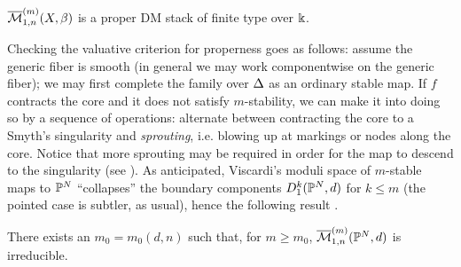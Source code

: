 \begin{prop}\cite[Theorem 3.6]{VISC}
 $\overline{\mathcal{M}}^{(m)}_{1,n}(X,\beta)$ is a proper DM stack of finite type over $\Bbbk$.
\end{prop}
Checking the valuative criterion for properness goes as follows: assume the generic fiber is smooth (in general we may work componentwise on the generic fiber); we may first complete the family over $\Delta$ as an ordinary stable map. If $f$ contracts the core and it does not satisfy $m$-stability, we can make it into doing so by a sequence of operations: alternate between contracting the core to a Smyth's singularity and \emph{sprouting}, i.e. blowing up at markings or nodes along the core. Notice that more sprouting may be required in order for the map to descend to the singularity (see \cite[Remark 2.6]{BCM}). As anticipated, Viscardi's moduli space of $m$-stable maps to $\mathbb P^N$ ``collapses'' the boundary components $D^k_1(\mathbb P^N,d)$ for $k\leq m$ (the pointed case is subtler, as usual), hence the following result \cite[Corollary 5.10]{VISC}.
\begin{prop}
 There exists an $m_0=m_0(d,n)$ such that, for $m\geq m_0$, $\overline{\mathcal{M}}^{(m)}_{1,n}(\mathbb P^N,d)$ is irreducible.
\end{prop}

